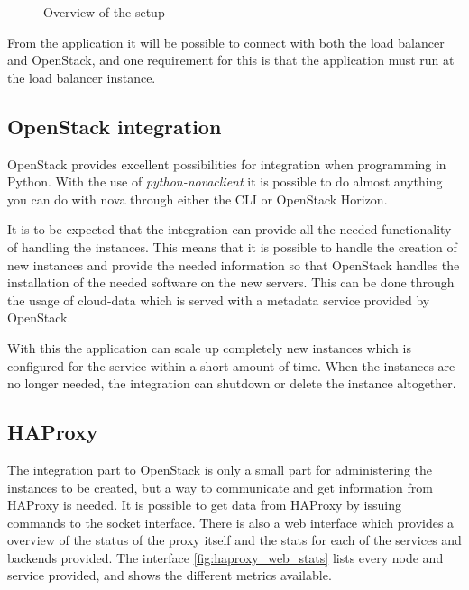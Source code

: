 \begin{figure}[htp]
\centering
{}
\caption{\label{fig:overview}Overview of the setup}
\end{figure}

From the application it will be possible to connect with both the load balancer
and OpenStack, and one requirement for this is that the application must run at
the load balancer instance.



\subsection{OpenStack integration}
OpenStack provides excellent possibilities for integration when programming in
Python. With the use of \textit{python-novaclient} \cite{OpenStackNovaClient} 
it is possible to do almost anything you can do with nova through either the 
CLI or OpenStack Horizon.

It is to be expected that the integration can provide all the needed
functionality of handling the instances. This means that it is possible to
handle the creation of new instances and provide the needed information so that
OpenStack handles the installation of the needed software on the new servers.
This can be done through the usage of cloud-data which is served with a
metadata service provided by OpenStack.

With this the application can scale up completely new instances which is
configured for the service within a short amount of time. When the instances
are no longer needed, the integration can shutdown or delete the instance
altogether.

\subsection{HAProxy}
The integration part to OpenStack is only a small part for administering the
instances to be created, but a way to communicate and get information from
HAProxy is needed. It is possible to get data from HAProxy by issuing commands
to the socket interface. There is also a web interface which provides a
overview of the status of the proxy itself and the stats for each of the
services and backends provided. The interface \vref{fig:haproxy_web_stats} lists
every node and service provided, and shows the different metrics available.


